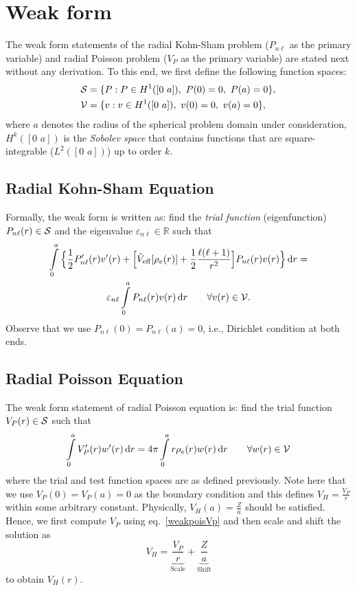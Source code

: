 \documentclass[12pt,dvipsnames]{article}
\begin{document}
\section{Weak form}
The weak form statements of the radial Kohn-Sham problem ($P_{n \ell}$ as the 
primary variable) and radial Poisson problem ($V_P$ as the primary variable) are stated next 
without any derivation. To this end, we first define the following function spaces:
\begin{align*}
{\cal S} &= \{ P: P \in H^1([0 \, \, a]), \ P(0) = 0, \ P(a) = 0 \}, \\
{\cal V} &= \{ v: v \in H^1([0 \, \, a]), \ v(0) = 0, \ v(a) = 0 \},
\end{align*}
where $a$ denotes the radius of the spherical problem domain under consideration, 
$H^k([0 \, \, a])$ is the \emph{Sobolev space} that contains
functions that are square-integrable ($L^2([0 \, \, a])$) up to order $k$.
%
\subsection{Radial Kohn-Sham Equation}
Formally, the weak form is written as: find the \emph{trial function} (eigenfunction) 
$P_{n \ell}(r) \in {\cal S}$ and the eigenvalue $\varepsilon_{n \ell} \in \mathbb{R}$
such that
\begin{multline} \label{weakksP}
\int\limits_{0}^a \Big\{ \frac{1}{2} P^\prime_{n \ell}(r) v^\prime(r) + \Big [ \hat{V}_{\rm{eff}}[\rho_e(r)] + \frac{1}{2}\frac{\ell(\ell + 1)}{r^2} \Big ]
P_{n \ell}(r) v(r) \Big\} \, \mathrm{d} r  = \\
\varepsilon_{n \ell} \int\limits_{0}^a P_{n \ell} (r) v(r) \, \mathrm{d} r \qquad \forall v(r) \in {\cal V}.
\end{multline}
Observe that we use  $P_{n \ell}(0) = P_{n \ell}(a) = 0$, i.e., 
Dirichlet condition at both ends.
%
\subsection{Radial Poisson Equation}
The weak form statement of radial Poisson equation is: 
find the trial function $V_P(r) \in {\cal S}$ such that
\begin{equation} \label{weakpoisVp}
\int\limits_{0}^a V^\prime_P(r) w^\prime(r) \, \mathrm{d} r = 4 \pi \int\limits_{0}^a r \rho_e(r) w(r) \, \mathrm{d} r \qquad \forall w(r) \in {\cal V}
\end{equation}
where the trial and test function spaces are as defined previously. Note here that we 
use $V_P(0) = V_P(a) = 0$ as the boundary condition and this defines $V_H = \frac{V_P}{r}$ 
within some arbitrary constant. Physically, $V_H(a) = \frac{Z}{a}$ should be satisfied. 
Hence, we first compute $V_P$ using eq.~\eqref{weakpoisVp} and then scale and shift the solution 
as 
\begin{equation*}
V_H = \underbrace{\frac{V_P}{r}}_{\textrm{Scale}} + \underbrace{\frac{Z}{a}}_{\textrm{Shift}}
\end{equation*}
to obtain $V_H(r)$.
%
\end{document}
